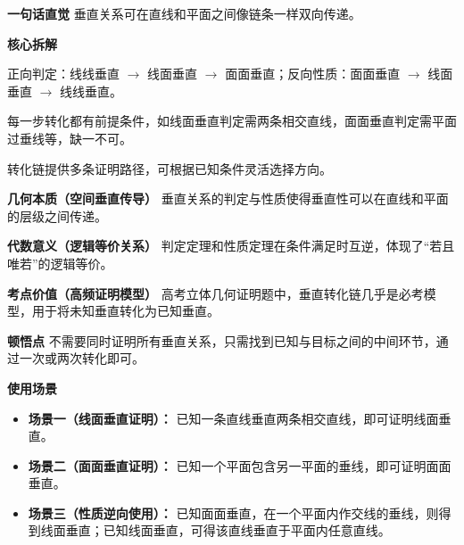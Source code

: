 \begin{explanationbox}
	\textbf{\textcolor{CExplanation}{一句话直觉}}
	垂直关系可在直线和平面之间像链条一样双向传递。

	\medskip
	\textbf{\textcolor{CExplanation}{核心拆解}}
	\begin{description}[style=nextline, leftmargin=2.8em, labelsep=0.5em, itemsep=0.45em]
		\item[\textbf{要点一（判定性质方向）：}]
			正向判定：线线垂直 $\to$ 线面垂直 $\to$ 面面垂直；反向性质：面面垂直 $\to$ 线面垂直 $\to$ 线线垂直。
		\item[\textbf{要点二（条件限制关键）：}]
			每一步转化都有前提条件，如线面垂直判定需两条相交直线，面面垂直判定需平面过垂线等，缺一不可。
		\item[\textbf{要点三（转化工具价值）：}]
			转化链提供多条证明路径，可根据已知条件灵活选择方向。
	\end{description}

	\medskip
	\textbf{\textcolor{CExplanation}{几何本质（空间垂直传导）}}
	垂直关系的判定与性质使得垂直性可以在直线和平面的层级之间传递。

	\medskip
	\textbf{\textcolor{CExplanation}{代数意义（逻辑等价关系）}}
	判定定理和性质定理在条件满足时互逆，体现了“若且唯若”的逻辑等价。

	\medskip
	\textbf{\textcolor{CExplanation}{考点价值（高频证明模型）}}
	高考立体几何证明题中，垂直转化链几乎是必考模型，用于将未知垂直转化为已知垂直。

	\medskip
	\textbf{\textcolor{CExplanation}{顿悟点}}
	不需要同时证明所有垂直关系，只需找到已知与目标之间的中间环节，通过一次或两次转化即可。

	\medskip
	\textbf{\textcolor{CExplanation}{使用场景}}
	\begin{itemize}[leftmargin=*, itemsep=0.5em, topsep=0.4em]
		\item \textbf{场景一（线面垂直证明）：} 已知一条直线垂直两条相交直线，即可证明线面垂直。
		\item \textbf{场景二（面面垂直证明）：} 已知一个平面包含另一平面的垂线，即可证明面面垂直。
		\item \textbf{场景三（性质逆向使用）：} 已知面面垂直，在一个平面内作交线的垂线，则得到线面垂直；已知线面垂直，可得该直线垂直于平面内任意直线。
	\end{itemize}

\end{explanationbox}
